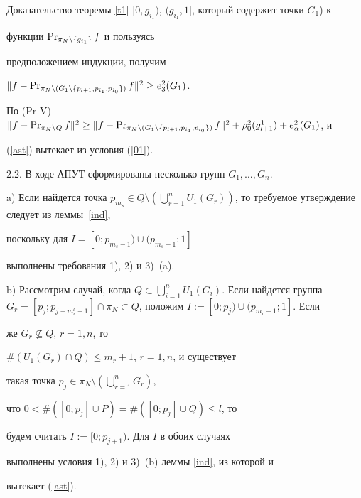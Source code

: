 \begin{pf*}{Доказательство теоремы \ref{t1}}
$[0,g_{i_1})$, $(g_{i_1},1]$, который содержит точки $G_1$) к


функции $\operatorname{Pr}_{\pi_N\setminus\{g_{i_1}\}}f$ и пользуясь


предположением индукции, получим


$\|f-\PR_{\pi_N\setminus(G_1\setminus


\{p_{l+1},p_{i_1},p_{i_0}\})}f\|^2\geq e_3^2(G_1)$.


По (Pr-V) \ $\|f-\PR_{\pi_N\setminus Q}f\|^2\geq


\|f-\PR_{\pi_N\setminus(G_1\setminus \{p_{l+1},p_{i_1},p_{i_0}


\})}f \|^2+\rho_{0}^2(g_{l+1}^1)+e_{\alpha}^2(G_1)$, и


(\ref{ast}) вытекает из условия (\ref{01}).





2.2. В ходе АПУТ сформированы несколько групп $G_1,\dotsc,G_n$.





a) Если найдется точка $p_{m_s}\in Q\setminus(\bigcup\limits_{r=


1}^{n}U_1(G_r))$, то требуемое утверждение следует из леммы~\ref{ind},


поскольку для $I=[0;p_{m_s-1})\cup(p_{m_s+1};1]$


выполнены требования 1), 2) и 3)~(a).





b) Рассмотрим случай, когда $Q{\subset} \bigcup\limits_{i=1}^{n}U_


1(G_i)$. Если найдется группа $G_r=[p_j;p_{j+m_r^l-1}]\cap \pi_N


{\subset} Q$, положим $I:=[0;p_j)\cup (p_{m_r-1};1]$. Если


же $G_r\nsubseteq Q$, $r=\overline{1,n}$, то


$\#(U_1(G_r)\cap Q)\leq m_r+1$, $r=\overline{1,n}$, и существует


такая точка $p_j\in \pi_N \setminus (\bigcup\limits_{r=1}^{n} G_r)$,


что $ 0<\#([0;p_j]\cup P)=\# ([0;p_j]\cup Q)\leq l$, то


будем считать $I:=[0;p_{j+1})$. Для $I$ в обоих случаях


выполнены условия 1), 2) и 3)~(b) леммы \ref{ind}, из которой и


вытекает (\ref{ast}).


\end{pf*}








